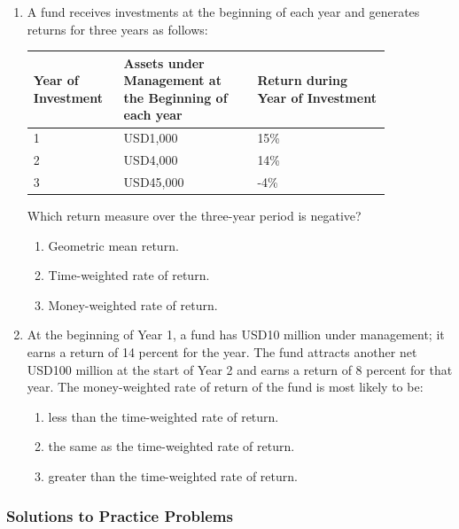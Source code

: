 \begin{enumerate}
	\item A fund receives investments at the beginning of each year and generates returns for three years as follows:
	      \begin{center}
	      \begin{tabular}{p{0.18\linewidth} | p{0.33\linewidth} | p{0.33\linewidth}}
		      \toprule
		      \textbf{Year of Investment} & \textbf{Assets under Management at the Beginning of each year} & \textbf{Return during Year of Investment} \\
		      \midrule
		      1 & USD1,000 & 15\% \\
		      2 & USD4,000 & 14\% \\
		      3 & USD45,000 & -4\% \\
		      \bottomrule
	      \end{tabular}
	      \end{center}
	      Which return measure over the three-year period is negative?
	      \begin{enumerate}[label=\Alph*.]
		      \item Geometric mean return.
		      \item Time-weighted rate of return.
		      \item Money-weighted rate of return.
	      \end{enumerate}

	\item At the beginning of Year 1, a fund has USD10 million under management; it earns a return of 14 percent for the year. The fund attracts another net USD100 million at the start of Year 2 and earns a return of 8 percent for that year. The money-weighted rate of return of the fund is most likely to be:
	      \begin{enumerate}[label=\Alph*.]
		      \item less than the time-weighted rate of return.
		      \item the same as the time-weighted rate of return.
		      \item greater than the time-weighted rate of return.
	      \end{enumerate}
\end{enumerate}

\subsubsection{Solutions to Practice Problems}
\label{subsec:app_Solutions_M3}

